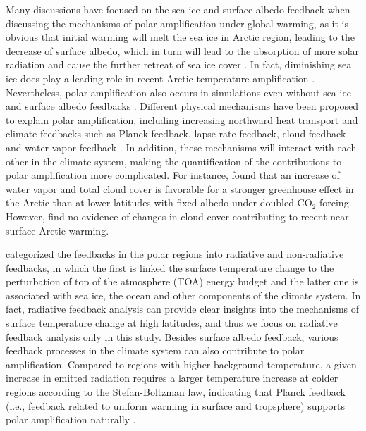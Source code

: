 Many discussions have focused on the sea ice and surface albedo feedback when discussing the mechanisms of polar amplification under global warming, as it is obvious that initial warming will melt the sea ice in Arctic region, leading to the decrease of surface albedo, which in turn will lead to the absorption of more solar radiation and cause the further retreat of sea ice cover \citep{Serreze2011}. In fact, diminishing sea ice does play a leading role in recent Arctic temperature amplification \citep{Screen2010}. Nevertheless, polar amplification also occurs in simulations even without sea ice and surface albedo feedbacks \citep[e.g.,][]{Alexeev2005,Langen2012,Cai2005,Cai2006}. Different physical mechanisms have been proposed to explain polar amplification, including increasing northward heat transport \citep{Alexeev2005} and climate feedbacks such as Planck feedback, lapse rate feedback, cloud feedback and water vapor feedback \citep{Pithan2014,Screen2010,Vavrus2004}. In addition, these mechanisms will interact with each other in the climate system, making the quantification of the contributions to polar amplification more complicated. For instance, \cite{Graversen2009} found that an increase of water vapor and total cloud cover is favorable for a stronger greenhouse effect in the Arctic than at lower latitudes with fixed albedo under doubled CO$_2$ forcing. However, \cite{Screen2010} find no evidence of changes in cloud cover contributing to recent near-surface Arctic warming.
 
\cite{Goosse2018} categorized the feedbacks in the polar regions into radiative and non-radiative feedbacks, in which the first is linked the surface temperature change to the perturbation of top of the atmosphere (TOA) energy budget and the latter one is associated with sea ice, the ocean and other components of the climate system. In fact, radiative feedback analysis can provide clear insights into the mechanisms of surface temperature change at high latitudes, and thus we focus on radiative feedback analysis only in this study. Besides surface albedo feedback, various feedback processes in the climate system can also contribute to polar amplification. Compared to regions with higher background temperature, a given increase in emitted radiation requires a larger temperature increase at colder regions according to the Stefan-Boltzman law, indicating that Planck feedback (i.e., feedback related to uniform warming in surface and tropsphere) supports polar amplification naturally \citep{Pithan2014}.

